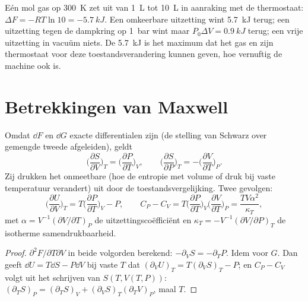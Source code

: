 \begin{example}\label{ex:b2:thermodynamic-potentials:expansion}
Eén mol gas op \qty{300}{K} zet uit van \qty{1}{L} tot \qty{10}{L} in
aanraking met de thermostaat: $\Delta F = -RT\ln 10 = \qty{-5.7}{kJ}$. Een
omkeerbare uitzetting wint \qty{5.7}{kJ} terug; een uitzetting tegen de
dampkring op \qty{1}{bar} wint maar $P_0\Delta V = \qty{0.9}{kJ}$ terug; een
vrije uitzetting in vacuüm niets. De \qty{5.7}{kJ} is het maximum dat
het gas en zijn thermostaat voor deze toestandsverandering kunnen geven, hoe
vernuftig de machine ook is.
\end{example}

\section{Betrekkingen van Maxwell}

\begin{theorem}\label{thm:b2:thermodynamic-potentials:maxwell}
Omdat $\dd F$ en $\dd G$ exacte differentialen zijn (de stelling van Schwarz
over gemengde tweede afgeleiden), geldt
\[
\Big(\frac{\partial S}{\partial V}\Big)_T = \Big(\frac{\partial P}{\partial T}\Big)_V,
\qquad
\Big(\frac{\partial S}{\partial P}\Big)_T = -\Big(\frac{\partial V}{\partial T}\Big)_P .
\]
Zij drukken het onmeetbare (hoe de entropie met volume of
druk bij vaste temperatuur verandert) uit door de toestandsvergelijking. Twee
gevolgen:
\[
\Big(\frac{\partial U}{\partial V}\Big)_T = T\Big(\frac{\partial P}{\partial T}\Big)_V - P,
\qquad
C_P - C_V = T\Big(\frac{\partial P}{\partial T}\Big)_V\Big(\frac{\partial V}{\partial T}\Big)_P
= \frac{TV\alpha^2}{\kappa_T} ,
\]
met $\alpha = V^{-1}(\partial V/\partial T)_P$ de uitzettingscoëfficiënt en
$\kappa_T = -V^{-1}(\partial V/\partial P)_T$ de isotherme samendrukbaarheid.
\end{theorem}

\begin{proof}
$\partial^2F/\partial T\partial V$ in beide volgorden berekend:
$-\partial_VS =
-\partial_TP$. Idem voor $G$. Dan geeft
$\dd U = T\dd S - P\dd V$ bij vaste $T$
dat $(\partial_VU)_T = T(\partial_VS)_T - P$; en $C_P - C_V$ volgt
uit het schrijven van $S(T,V(T,P))$:
$(\partial_TS)_P = (\partial_TS)_V +
(\partial_VS)_T(\partial_TV)_P$, maal
$T$.
\end{proof}

